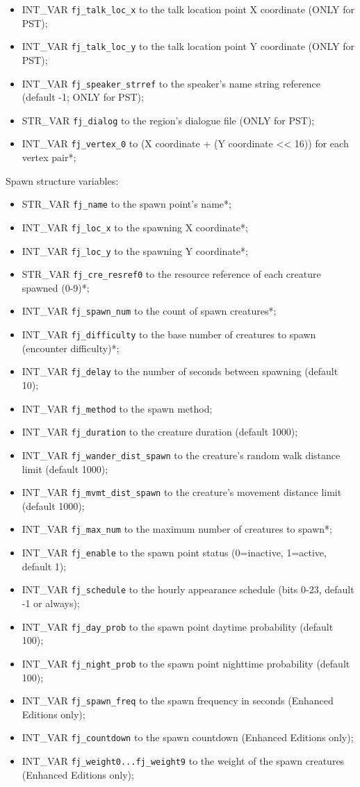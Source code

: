 \documentclass{article}
\begin{document}
\begin{itemize}
\item INT_VAR \verb+fj_talk_loc_x+ to the talk location point X coordinate (ONLY for PST);
\item INT_VAR \verb+fj_talk_loc_y+ to the talk location point Y coordinate (ONLY for PST);
\item INT_VAR \verb+fj_speaker_strref+ to the speaker's name string reference (default -1; ONLY for PST);
\item STR_VAR \verb+fj_dialog+ to the region's dialogue file (ONLY for PST);
\item INT_VAR \verb+fj_vertex_0+ to (X coordinate + (Y coordinate << 16)) for each vertex pair*;
\end{itemize}
Spawn structure variables:
\begin{itemize}
\item STR_VAR \verb+fj_name+ to the spawn point's name*;
\item INT_VAR \verb+fj_loc_x+ to the spawning X coordinate*;
\item INT_VAR \verb+fj_loc_y+ to the spawning Y coordinate*;
\item STR_VAR \verb+fj_cre_resref0+ to the resource reference of each creature spawned (0-9)*;
\item INT_VAR \verb+fj_spawn_num+ to the count of spawn creatures*;
\item INT_VAR \verb+fj_difficulty+ to the base number of creatures to spawn (encounter difficulty)*;
\item INT_VAR \verb+fj_delay+ to the number of seconds between spawning (default 10);
\item INT_VAR \verb+fj_method+ to the spawn method;
\item INT_VAR \verb+fj_duration+ to the creature duration (default 1000);
\item INT_VAR \verb+fj_wander_dist_spawn+ to the creature's random walk distance limit (default 1000);
\item INT_VAR \verb+fj_mvmt_dist_spawn+ to the creature's movement distance limit (default 1000);
\item INT_VAR \verb+fj_max_num+ to the maximum number of creatures to spawn*;
\item INT_VAR \verb+fj_enable+ to the spawn point status (0=inactive, 1=active, default 1);
\item INT_VAR \verb+fj_schedule+ to the hourly appearance schedule (bits 0-23, default -1 or always);
\item INT_VAR \verb+fj_day_prob+ to the spawn point daytime probability (default 100);
\item INT_VAR \verb+fj_night_prob+ to the spawn point nighttime probability (default 100);
\item INT_VAR \verb+fj_spawn_freq+ to the spawn frequency in seconds (Enhanced Editions only);
\item INT_VAR \verb+fj_countdown+ to the spawn countdown (Enhanced Editions only);
\item INT_VAR \verb+fj_weight0...fj_weight9+ to the weight of the spawn creatures (Enhanced Editions only);
\end{itemize}
\end{document}
